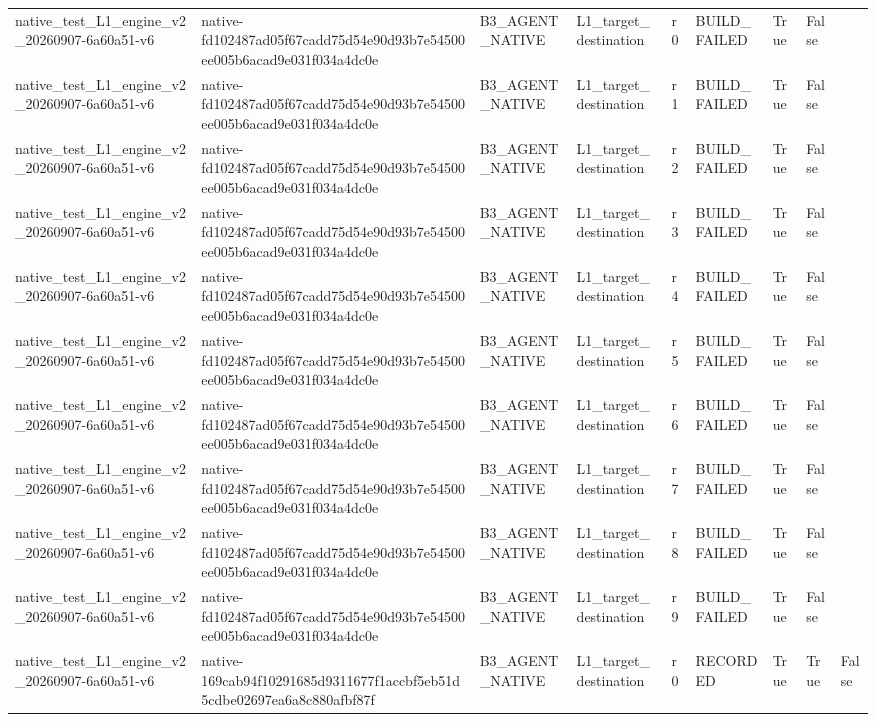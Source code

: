 \begin{tabular}{lllllllll}
native\_test\_L1\_engine\_v2\_20260907-6a60a51-v6 & native-fd102487ad05f67cadd75d54e90d93b7e54500ee005b6acad9e031f034a4dc0e & B3\_AGENT\_NATIVE & L1\_target\_destination & r0 & BUILD\_FAILED & True & False &  \\
native\_test\_L1\_engine\_v2\_20260907-6a60a51-v6 & native-fd102487ad05f67cadd75d54e90d93b7e54500ee005b6acad9e031f034a4dc0e & B3\_AGENT\_NATIVE & L1\_target\_destination & r1 & BUILD\_FAILED & True & False &  \\
native\_test\_L1\_engine\_v2\_20260907-6a60a51-v6 & native-fd102487ad05f67cadd75d54e90d93b7e54500ee005b6acad9e031f034a4dc0e & B3\_AGENT\_NATIVE & L1\_target\_destination & r2 & BUILD\_FAILED & True & False &  \\
native\_test\_L1\_engine\_v2\_20260907-6a60a51-v6 & native-fd102487ad05f67cadd75d54e90d93b7e54500ee005b6acad9e031f034a4dc0e & B3\_AGENT\_NATIVE & L1\_target\_destination & r3 & BUILD\_FAILED & True & False &  \\
native\_test\_L1\_engine\_v2\_20260907-6a60a51-v6 & native-fd102487ad05f67cadd75d54e90d93b7e54500ee005b6acad9e031f034a4dc0e & B3\_AGENT\_NATIVE & L1\_target\_destination & r4 & BUILD\_FAILED & True & False &  \\
native\_test\_L1\_engine\_v2\_20260907-6a60a51-v6 & native-fd102487ad05f67cadd75d54e90d93b7e54500ee005b6acad9e031f034a4dc0e & B3\_AGENT\_NATIVE & L1\_target\_destination & r5 & BUILD\_FAILED & True & False &  \\
native\_test\_L1\_engine\_v2\_20260907-6a60a51-v6 & native-fd102487ad05f67cadd75d54e90d93b7e54500ee005b6acad9e031f034a4dc0e & B3\_AGENT\_NATIVE & L1\_target\_destination & r6 & BUILD\_FAILED & True & False &  \\
native\_test\_L1\_engine\_v2\_20260907-6a60a51-v6 & native-fd102487ad05f67cadd75d54e90d93b7e54500ee005b6acad9e031f034a4dc0e & B3\_AGENT\_NATIVE & L1\_target\_destination & r7 & BUILD\_FAILED & True & False &  \\
native\_test\_L1\_engine\_v2\_20260907-6a60a51-v6 & native-fd102487ad05f67cadd75d54e90d93b7e54500ee005b6acad9e031f034a4dc0e & B3\_AGENT\_NATIVE & L1\_target\_destination & r8 & BUILD\_FAILED & True & False &  \\
native\_test\_L1\_engine\_v2\_20260907-6a60a51-v6 & native-fd102487ad05f67cadd75d54e90d93b7e54500ee005b6acad9e031f034a4dc0e & B3\_AGENT\_NATIVE & L1\_target\_destination & r9 & BUILD\_FAILED & True & False &  \\
native\_test\_L1\_engine\_v2\_20260907-6a60a51-v6 & native-169cab94f10291685d9311677f1accbf5eb51d5cdbe02697ea6a8c880afbf87f & B3\_AGENT\_NATIVE & L1\_target\_destination & r0 & RECORDED & True & True & False \\

\end{tabular}
